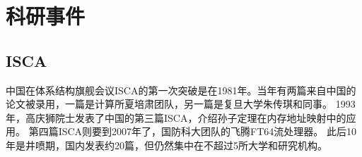 \chapter{科研事件}

\section{ISCA}

中国在体系结构旗舰会议ISCA的第一次突破是在1981年。当年有两篇来自中国的论文被录用，一篇是计算所夏培肃团队，另一篇是复旦大学朱传琪和同事。
1993年，高庆狮院士发表了中国的第三篇ISCA，介绍孙子定理在内存地址映射中的应用。
第四篇ISCA则要到2007年了，国防科大团队的飞腾FT64流处理器。
此后10年是井喷期，国内发表约20篇，但仍然集中在不超过5所大学和研究机构。


